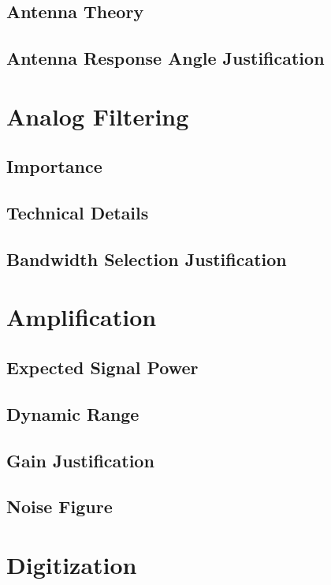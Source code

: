 \documentclass[11pt]{uhthesis}
\begin{document}
	\subsection{Antenna Theory}
		
	\subsection{Antenna Response Angle Justification}
	
\section{Analog Filtering}
	\subsection{Importance}
	
	\subsection{Technical Details}
		
	\subsection{Bandwidth Selection Justification} 
		
\section{Amplification}
	\subsection{Expected Signal Power}
	
	\subsection{Dynamic Range}
	
	\subsection{Gain Justification}
	
	\subsection{Noise Figure} 
	
	
	
\section{Digitization}
\end{document}
